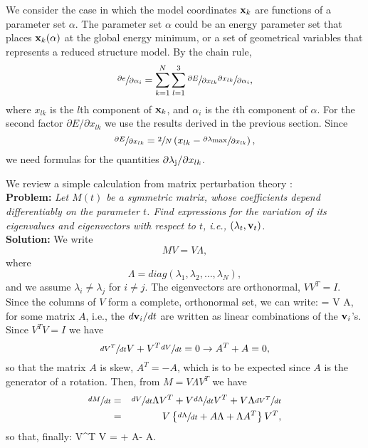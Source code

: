 \documentclass[9pt,lineno]{elife}
\begin{document}
We consider the case in which the model coordinates ${\bf x}_k$ are functions of
a parameter set ${\alpha}$. The parameter set $\alpha$ could be an energy 
parameter set that places
${\bf x}_k(\alpha)$ at the global energy minimum, or a set of geometrical
variables that represents a reduced structure model.
By the chain rule,
\[ 
\sfrac{\partial e}{\partial \alpha_i} = 
\sum_{k=1}^{N}\sum_{l=1}^{3}\sfrac{\partial E}{\partial x_{lk}}
\sfrac{\partial x_{lk}}{\partial \alpha_i},
\]
where $x_{lk}$ is the $l$th component of ${\bf x}_k$, and $\alpha_i$ is the
$i$th component of $\alpha$.
For the second factor ${\partial E}/{\partial x_{lk}}$ we use the results
derived in the previous section. Since 
\begin{equation}
\label{grad}
 \sfrac{\partial E}{\partial x_{lk}} = \sfrac{2}{N}
\left(x_{lk} - \sfrac{\partial 
\lambda_{\mbox{\scriptsize{max}}}}{\partial x_{lk}} \right), 
\end{equation}
we need formulas for the quantities ${\partial \lambda_{\mbox{\scriptsize{j}}}}/{\partial x_{lk}}$. 

We review a simple calculation from matrix perturbation theory
\cite{StSu}:\\
{\bf Problem:}
{\em Let $M(t)$ be a symmetric matrix, whose coefficients depend
differentiably on the
parameter $t$. Find expressions for the variation of its eigenvalues
and eigenvectors with respect to $t$, i.e., $(\lambda_t, {\bf v}_t)$. }\\
{\bf Solution: }
We write
\[ M V = V \Lambda, \]
where
\[ \Lambda = diag(\lambda_1, \lambda_2, \ldots,\lambda_N), \]
and we assume $\lambda_i \ne \lambda_j$ for $i \ne j$.
The eigenvectors are orthonormal, $V V^T = I$. Since the columns of $V$
form a complete, orthonormal set, we can write:
\be
{} = V A,
\label{eq:a}
\ee
for some matrix $A$,
i.e., the $d{\bf v}_i/dt$ are written as linear combinations of the
${\bf v}_i$'s. Since $V^T V = I$ we have
\[ \sfrac{d V^T}{d t} V + V^T \sfrac{d V}{d t} = 0 \rightarrow A^T + A = 0, \]
so that the matrix $A$ is skew, $A^T = -A$, which is to be expected since
$A$ is the generator of a rotation.
Then, from $M = V \Lambda V^T $ we have
\begin{eqnarray*}
\sfrac{d M}{d t} & = & \sfrac{d V}{d t}\Lambda V^T +
V \sfrac{d\Lambda}{d t} V^T +
V \Lambda \sfrac{d V^T}{d t} \\
& = & V \left\{ \sfrac{d\Lambda}{d t} + A\Lambda + \Lambda A^T
\right\} V^T,
\end{eqnarray*}
so that, finally:
\be
\label{evol}
V^T  V =  + A\Lambda - \Lambda A.
\ee
\end{document}
